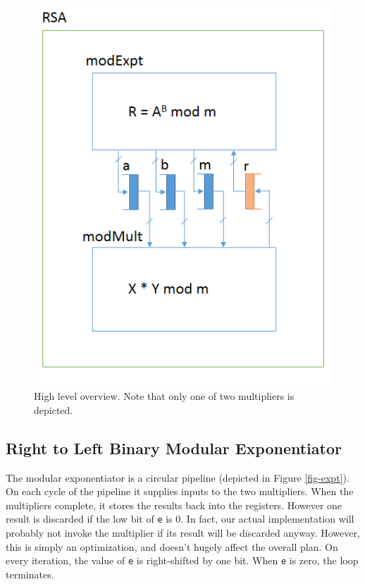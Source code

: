 \documentclass[12pt]{article}
\begin{document}
\begin{figure}
  \begin{centering}
    \includegraphics[scale=1]{top_level.png}
    \caption{High level overview. Note that only one of two multipliers is depicted.}
    \label{fig-top}
  \end{centering}
\end{figure}

\subsection{Right to Left Binary Modular Exponentiator}
The modular exponentiator is a circular pipeline (depicted in Figure \ref{fig-expt}).
On each cycle of the pipeline it supplies inputs to the two multipliers.
When the multipliers complete, it stores the results back into the registers.
However one result is discarded if the low bit of {\tt e} is 0.
In fact, our actual implementation will probably not invoke the multiplier
if its result will be discarded anyway.
However, this is simply an optimization, and doesn't hugely affect the overall plan.
On every iteration, the value of {\tt e} is right-shifted by one bit.
When {\tt e} is zero, the loop terminates.
\end{document}
